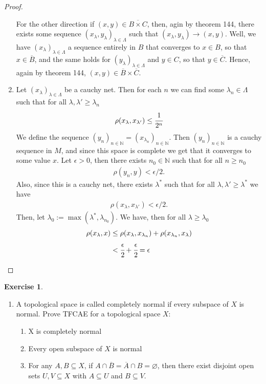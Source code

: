 \documentclass[12pt]{extarticle}
\newcommand{\N}{\mathbb{N}}
\newcommand{\<}{\langle}
\renewcommand{\>}{\rangle}
\renewcommand{\emptyset}{\varnothing}
\theoremstyle{definition}
\newtheorem{exercise}{Exercise}
\begin{document}
\begin{proof}
\begin{enumerate}
    For the other direction if $(x,y) \in \overline{B \times C}$, then, agin by theorem 144, there exists some sequence
    $(x_{\lambda}, y_{\lambda})_{\lambda \in \Lambda}$ such that $(x_{\lambda}, y_{\lambda}) \to (x,y)$. Well, we have $(x_{\lambda})_{\lambda \in \Lambda}$ a sequence entirely in $B$ that converges to $x \in B$,
    so that $x \in \overline{B}$, and the same holds for $(y_{\lambda})_{\lambda \in \Lambda}$ and $y \in C$, so that $y \in \overline{C}$. Hence, again by theorem 144, $(x,y) \in \overline{B} \times \overline{C}$.
  \item
    Let $(x_{\lambda})_{\lambda \in \Lambda}$ be a cauchy net. Then for each $n$ we can find some $\lambda_n \in \Lambda$ such that for all $\lambda, \lambda' \geq \lambda_n$
    \begin{align*}
      \rho(x_{\lambda}, x_{\lambda'}) \leq \cfrac{1}{2^n}
    \end{align*}
    We define the sequence $(y_n)_{n \in \N} = (x_{\lambda_n})_{n \in \N}$. Then $(y_n)_{n \in \N}$ is a cauchy sequence in $M$, and since
    this space is complete we get that it converges to some value $x$. Let $\epsilon>0$, then there exists $n_0 \in \N$ such that for all $n \geq n_0$
    \begin{align*}
      \rho(y_n, y) < \epsilon/2.
    \end{align*}
    Also, since this is a cauchy net, there exists $\lambda^{*}$ such that for all $\lambda, \lambda' \geq \lambda^{*}$ we have
    \begin{align*}
      \rho(x_{\lambda}, x_{\lambda'}) < \epsilon/2.
    \end{align*}
    Then, let $\lambda_0 := \max(\lambda^{*}, \lambda_{n_0})$. We have, then for all $\lambda \geq \lambda_0$
    \begin{align*}
      \rho(x_{\lambda}, x) &\leq \rho(x_{\lambda}, x_{\lambda_n}) + \rho(x_{\lambda_n}, x_{\lambda})  \\
      & < \cfrac{\epsilon}{2} + \cfrac{\epsilon}{2} = \epsilon
    \end{align*}
  \end{enumerate}
\end{proof}
\begin{exercise}
  \begin{enumerate}
  \item
    A topological space is called completely normal if every subspace of $X$ is normal. Prove TFCAE for a topological space $X$:
    \begin{enumerate}
    \item X is completely normal
    \item Every open subspace of $X$ is normal
    \item For any $A,B \subseteq X$, if $A \cap \overline{B} = \overline{A} \cap B = \emptyset$, then there exist disjoint open sets $U,V \subseteq X$ with $A \subseteq U$ and $B \subseteq V$.
    \end{enumerate}
  \end{enumerate}
\end{exercise}
\end{document}
